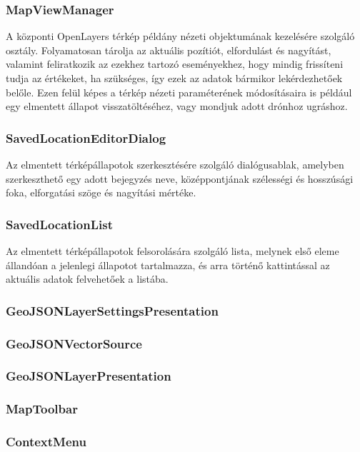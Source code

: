 \subsubsection{MapViewManager}
A központi OpenLayers térkép példány nézeti objektumának kezelésére szolgáló
osztály. Folyamatosan tárolja az aktuális pozítiót, elfordulást és nagyítást,
valamint feliratkozik az ezekhez tartozó eseményekhez, hogy mindig frissíteni
tudja az értékeket, ha szükséges, így ezek az adatok bármikor lekérdezhetőek
belőle. Ezen felül képes a térkép nézeti paraméterének módosításaira is például
egy elmentett állapot visszatöltéséhez, vagy mondjuk adott drónhoz ugráshoz.

\subsubsection{SavedLocationEditorDialog}
Az elmentett térképállapotok szerkesztésére szolgáló dialógusablak, amelyben
szerkeszthető egy adott bejegyzés neve, középpontjának szélességi és hosszúsági
foka, elforgatási szöge és nagyítási mértéke.

\subsubsection{SavedLocationList}
Az elmentett térképállapotok felsorolására szolgáló lista, melynek első eleme
állandóan a jelenlegi állapotot tartalmazza, és arra történő kattintással az
aktuális adatok felvehetőek a listába.

\subsubsection{GeoJSONLayerSettingsPresentation}
\subsubsection{GeoJSONVectorSource}
\subsubsection{GeoJSONLayerPresentation}

\subsubsection{MapToolbar}
\subsubsection{ContextMenu}

